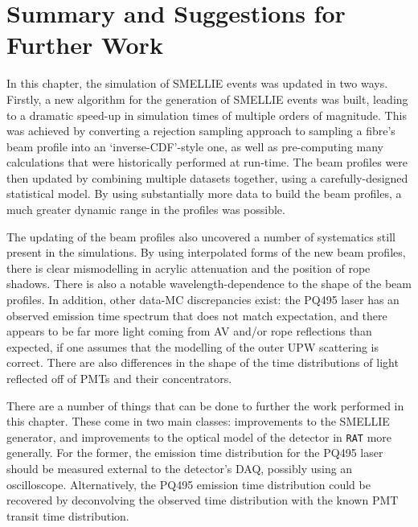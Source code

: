 

\section{Summary and Suggestions for Further Work}
In this chapter, the simulation of SMELLIE events was updated in two ways. Firstly, a new algorithm for the generation of SMELLIE events was built, leading to a dramatic speed-up in simulation times of multiple orders of magnitude. This was achieved by converting a rejection sampling approach to sampling a fibre's beam profile into an `inverse-CDF'-style one, as well as pre-computing many calculations that were historically performed at run-time. The beam profiles were then updated by combining multiple datasets together, using a carefully-designed statistical model. By using substantially more data to build the beam profiles, a much greater dynamic range in the profiles was possible.

The updating of the beam profiles also uncovered a number of systematics still present in the simulations. By using interpolated forms of the new beam profiles, there is clear mismodelling in acrylic attenuation and the position of rope shadows. There is also a notable wavelength-dependence to the shape of the beam profiles. In addition, other data-MC discrepancies exist: the PQ495 laser has an observed emission time spectrum that does not match expectation, and there appears to be far more light coming from AV and/or rope reflections than expected, if one assumes that the modelling of the outer UPW scattering is correct. There are also differences in the shape of the time distributions of light reflected off of PMTs and their concentrators.

There are a number of things that can be done to further the work performed in this chapter. These come in two main classes: improvements to the SMELLIE generator, and improvements to the optical model of the detector in \texttt{RAT} more generally. For the former, the emission time distribution for the PQ495 laser should be measured external to the detector's DAQ, possibly using an oscilloscope. Alternatively, the PQ495 emission time distribution could be recovered by deconvolving the observed time distribution with the known PMT transit time distribution.

